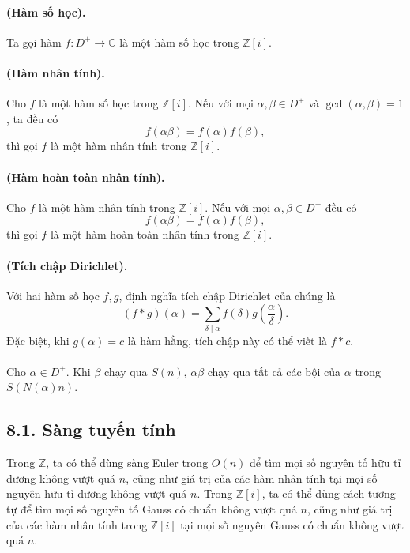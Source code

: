 \documentclass[11pt]{article}
\begin{document}
\paragraph{ (Hàm số học).}
Ta gọi hàm \(f:D^+\to\mathbb C\) là một hàm số học trong \(\mathbb Z[i]\).

\paragraph{ (Hàm nhân tính).}
Cho \(f\) là một hàm số học trong \(\mathbb Z[i]\). Nếu với mọi
\(\alpha,\beta\in D^+\) và \(\gcd(\alpha,\beta)=1\), ta đều có
\[
  f(\alpha\beta)=f(\alpha)f(\beta),
\]
thì gọi \(f\) là một hàm nhân tính trong \(\mathbb Z[i]\).

\paragraph{ (Hàm hoàn toàn nhân tính).}
Cho \(f\) là một hàm nhân tính trong \(\mathbb Z[i]\). Nếu với mọi
\(\alpha,\beta\in D^+\) đều có
\[
  f(\alpha\beta)=f(\alpha)f(\beta),
\]
thì gọi \(f\) là một hàm hoàn toàn nhân tính trong \(\mathbb Z[i]\).

\paragraph{ (Tích chập Dirichlet).}
Với hai hàm số học \(f,g\), định nghĩa tích chập Dirichlet của chúng là
\[
  (f*g)(\alpha)=\sum_{\delta\mid\alpha}f(\delta)g\!\left(\frac{\alpha}{\delta}\right).
\]
Đặc biệt, khi \(g(\alpha)=c\) là hàm hằng, tích chập này có thể viết là
\(f*c\).

\paragraph{}
Cho \(\alpha\in D^+\). Khi \(\beta\) chạy qua \(S(n)\), \(\alpha\beta\) chạy
qua tất cả các bội của \(\alpha\) trong \(S(N(\alpha)n)\).

\subsection*{8.1. Sàng tuyến tính}

Trong \(\mathbb Z\), ta có thể dùng sàng Euler trong \(O(n)\) để tìm mọi số
nguyên tố hữu tỉ dương không vượt quá \(n\), cũng như giá trị của các hàm
nhân tính tại mọi số nguyên hữu tỉ dương không vượt quá \(n\). Trong
\(\mathbb Z[i]\), ta có thể dùng cách tương tự để tìm mọi số nguyên tố Gauss
có chuẩn không vượt quá \(n\), cũng như giá trị của các hàm nhân tính trong
\(\mathbb Z[i]\) tại mọi số nguyên Gauss có chuẩn không vượt quá \(n\).
\end{document}
